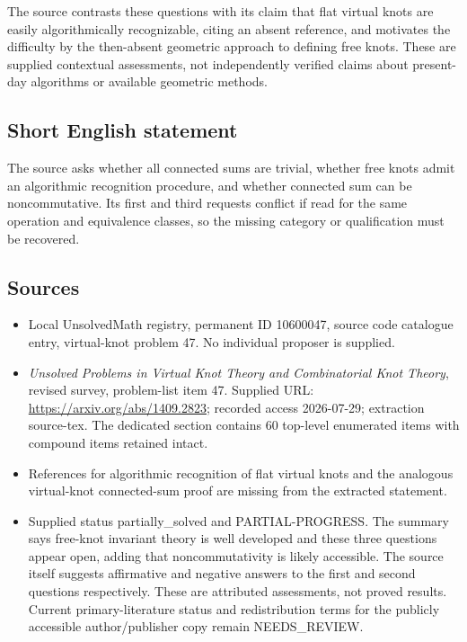 \documentclass[11pt]{article}
\begin{document}
The source contrasts these questions with its claim that flat virtual knots are easily algorithmically recognizable, citing an absent reference, and motivates the difficulty by the then-absent geometric approach to defining free knots. These are supplied contextual assessments, not independently verified claims about present-day algorithms or available geometric methods.
\subsection{Short English statement}
The source asks whether all connected sums are trivial, whether free knots admit an algorithmic recognition procedure, and whether connected sum can be noncommutative. Its first and third requests conflict if read for the same operation and equivalence classes, so the missing category or qualification must be recovered.
\subsection{Sources}
\begin{itemize}
\item Local UnsolvedMath registry, permanent ID 10600047, source code catalogue entry, virtual-knot problem 47. No individual proposer is supplied.
\item \emph{Unsolved Problems in Virtual Knot Theory and Combinatorial Knot Theory}, revised survey, problem-list item 47. Supplied URL: \url{https://arxiv.org/abs/1409.2823}; recorded access 2026-07-29; extraction source-tex. The dedicated section contains 60 top-level enumerated items with compound items retained intact.
\item References for algorithmic recognition of flat virtual knots and the analogous virtual-knot connected-sum proof are missing from the extracted statement.
\item Supplied status partially\_solved and PARTIAL-PROGRESS. The summary says free-knot invariant theory is well developed and these three questions appear open, adding that noncommutativity is likely accessible. The source itself suggests affirmative and negative answers to the first and second questions respectively. These are attributed assessments, not proved results. Current primary-literature status and redistribution terms for the publicly accessible author/publisher copy remain NEEDS\_REVIEW.
\end{itemize}
\end{document}
